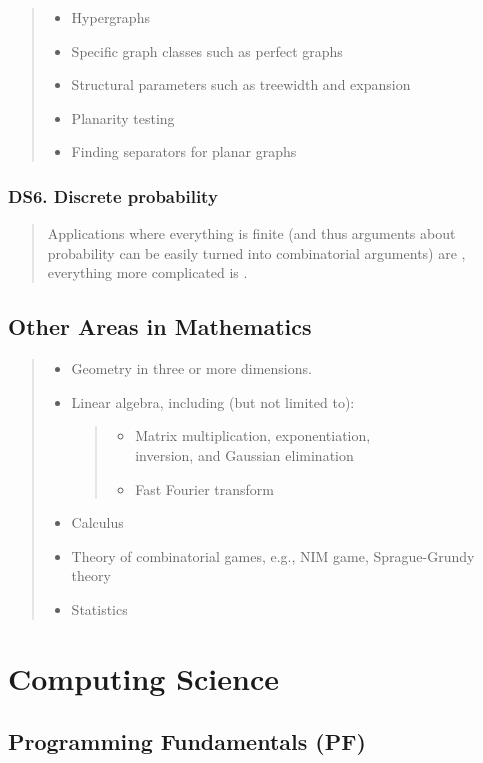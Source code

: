 \documentclass[a4paper,11pt,oneside]{article}
\newcommand{\xmark}{\ding{55}}%
\newcommand{\Cnofocus}{{\small\faQuestion}}
\newcommand{\Cexcluded}{{\small\xmark}}
\newcommand{\Iexcluded}{\item[\hbox to 1.8em{\Cexcluded\hfill}]}
\newenvironment{myitemize}{\begin{quote}\begin{itemize}\itemsep 0pt}{\end{itemize}\end{quote}}
\begin{document}
        \begin{myitemize}
        \Iexcluded Hypergraphs
        \Iexcluded Specific graph classes such as perfect graphs
        \Iexcluded Structural parameters such as treewidth and expansion
        \Iexcluded Planarity testing
        \Iexcluded Finding separators for planar graphs
        \end{myitemize}

    \subsubsection*{DS6. Discrete probability}
  
        \begin{quote}
        Applications where everything is finite (and thus arguments about probability can be easily
        turned into combinatorial arguments) are \Cnofocus, everything more complicated
        is \Cexcluded.
        \end{quote}

\subsection {Other Areas in Mathematics}%
\label{subsubsec:other-mathematics}

    \begin{myitemize}
    \Iexcluded Geometry in three or more dimensions.
    \Iexcluded  Linear algebra, including (but not limited to):
        \begin{myitemize}
        \item Matrix multiplication, exponentiation, \\
              inversion, and Gaussian elimination
        \item Fast Fourier transform
        \end{myitemize}
    \Iexcluded Calculus
    \Iexcluded Theory of combinatorial games, e.g., NIM game, Sprague-Grundy theory
    \Iexcluded Statistics
    \end{myitemize}


\section {Computing Science}
\label{subsec:computing-science}

\subsection {Programming Fundamentals (PF)}%
\label{subsubsec:PF}
\end{document}
